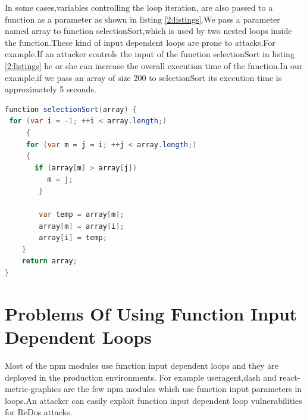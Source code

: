 \documentclass[authoryear,preprint]{sigplanconf}
\begin{document}
In some cases,variables controlling the loop iteration, are also passed to a function as a parameter as shown in listing  \ref{2:listings}.We pass a parameter named array to function selectionSort,which is used by two nested loops inside the function.These kind of  input dependent loops are prone to attacks.For example,If an attacker controls the input of the function selectionSort in listing \ref{2:listings} he or she  can increase the overall execution time of the function.In our example,if we pass an array of size 200 to selectionSort its execution time is approximately 5 seconds.\\

\lstset{numbers=left, numberstyle=\tiny, stepnumber=1, numbersep=5pt}
\lstset{basicstyle=\ttfamily}
\lstset{frame=tb}

\begin{lstlisting}[caption=Quadratic complexity algorithm for computing a repetitive sum,label=2:listings,language=Java]
function selectionSort(array) {
 for (var i = -1; ++i < array.length;)
     {
     for (var m = j = i; ++j < array.length;) 
     {
       if (array[m] > array[j])
          m = j;
        }

        var temp = array[m];
        array[m] = array[i];
        array[i] = temp;
    }
    return array;
}
\end{lstlisting}


\section{Problems Of Using  Function Input Dependent Loops  }
\label{sec:problems-of-using-loops}
Most of the npm modules use  function input dependent loops and they are deployed in the production environments. For example  useragent,dash and react-metric-graphics are the few npm  modules which use function input parameters in loops.An attacker can easily exploit function input dependent loop vulnerabilities for ReDos attacks.\\
\end{document}
